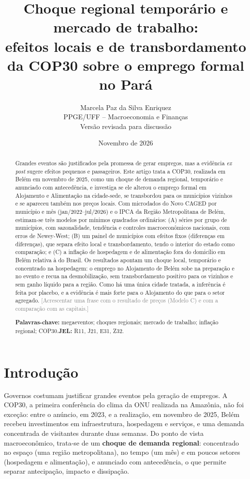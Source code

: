\documentclass[12pt,a4paper]{article}
\title{\bfseries Choque regional temporário e mercado de trabalho:\\
efeitos locais e de transbordamento da COP30 sobre o emprego formal no Pará}
\author{Marcela Paz da Silva Enriquez\\[2pt]
\small PPGE/UFF -- Macroeconomia e Finanças\\
\small Versão revisada para discussão}
\date{Novembro de 2026}
\newcommand{\afazer}[1]{\textcolor{gray}{[#1]}}
\begin{document}
\maketitle

\begin{abstract}
\noindent Grandes eventos são justificados pela promessa de gerar empregos, mas a evidência
\textit{ex post} sugere efeitos pequenos e passageiros. Este artigo trata a COP30, realizada em
Belém em novembro de 2025, como um choque de demanda regional, temporário e anunciado com
antecedência, e investiga se ele alterou o emprego formal em Alojamento e Alimentação na cidade-sede,
se transbordou para os municípios vizinhos e se apareceu também nos preços locais. Com microdados do
Novo CAGED por município e mês (jan/2022--jul/2026) e o IPCA da Região Metropolitana de Belém,
estimam-se três modelos por mínimos quadrados ordinários: (A) séries por grupo de municípios, com
sazonalidade, tendência e controles macroeconômicos nacionais, com erros de Newey-West; (B) um painel
de municípios com efeitos fixos (diferenças em diferenças), que separa efeito local e transbordamento,
tendo o interior do estado como comparação; e (C) a inflação de hospedagem e de alimentação fora do
domicílio em Belém relativa à do Brasil. Os resultados apontam um choque local, temporário e
concentrado na hospedagem: o emprego no Alojamento de Belém sobe na preparação e no evento e recua
na desmobilização, sem transbordamento positivo para os vizinhos e sem ganho líquido para a região.
Como há uma única cidade tratada, a inferência é feita por placebo, e a evidência é mais forte para
o Alojamento do que para o setor agregado. \afazer{Acrescentar uma frase com o resultado de preços
(Modelo C) e com a comparação com as capitais.}

\medskip\noindent\textbf{Palavras-chave:} megaeventos; choques regionais; mercado de trabalho;
inflação regional; COP30.\quad \textbf{JEL:} R11, J21, E31, Z32.
\end{abstract}

\section{Introdução}

Governos costumam justificar grandes eventos pela geração de empregos. A COP30, a primeira
conferência do clima da ONU realizada na Amazônia, não foi exceção: entre o anúncio, em 2023, e a
realização, em novembro de 2025, Belém recebeu investimentos em infraestrutura, hospedagem e
serviços, e uma demanda concentrada de visitantes durante duas semanas. Do ponto de vista
macroeconômico, trata-se de um \textbf{choque de demanda regional}: concentrado no espaço (uma região
metropolitana), no tempo (um mês) e em poucos setores (hospedagem e alimentação), e anunciado com
antecedência, o que permite separar antecipação, impacto e dissipação.
\end{document}
